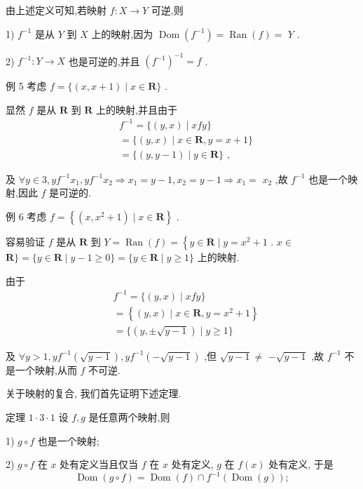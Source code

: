 由上述定义可知,若映射 $f : X \rightarrow  Y$ 可逆,则

1) ${f}^{-1}$ 是从 $Y$ 到 $X$ 上的映射,因为 $\operatorname{Dom}\left( {f}^{-1}\right)  = \operatorname{Ran}\left( f\right)  =$  $Y$ .

2) ${f}^{-1} : Y \rightarrow  X$ 也是可逆的,并且 ${\left( {f}^{-1}\right) }^{-1} = f$ .

例 5 考虑 $f = \{ \left( {x,x + 1}\right)  \mid  x \in  \mathbf{R}\}$ .

显然 $f$ 是从 $\mathbf{R}$ 到 $\mathbf{R}$ 上的映射,并且由于
\begin{align*}
	&{f}^{-1} = \{ \left( {y,x}\right)  \mid  {xfy}\}\\
	&= \{ \left( {y,x}\right)  \mid  x \in  \mathbf{R},y = x + 1\}\\
	&= \{ \left( {y,y - 1}\right)  \mid  y \in  \mathbf{R}\} \text{ , }
\end{align*}

及 $\forall y \in  3,y{f}^{-1}{x}_{1},y{f}^{-1}{x}_{2} \Rightarrow  {x}_{1} = y - 1,{x}_{2} = y - 1 \Rightarrow  {x}_{1} =$  ${x}_{2}$ ,故 ${f}^{-1}$ 也是一个映射,因此 $f$ 是可逆的.

例 6 考虑 $f = \left\{  {\left( {x,{x}^{2} + 1}\right)  \mid  x \in  \mathbf{R}}\right\}$ .

容易验证 $f$ 是从 $\mathbf{R}$ 到 $Y = \operatorname{Ran}\left( f\right)  = \left\{  {y \in  \mathbf{R} \mid  y = {x}^{2} + 1}\right.$ . $x \in$  $\mathbf{R}\}  = \{ y \in  \mathbf{R} \mid  y - 1 \geq  0\}  = \{ y \in  \mathbf{R} \mid  y \geq  1\}$ 上的映射.

由于
\begin{align*}
	&{f}^{-1} = \{ \left( {y,x}\right)  \mid  {xfy}\}\\
	&= \left\{  {\left( {y,x}\right)  \mid  x \in  \mathbf{R},y = {x}^{2} + 1}\right\}\\
	&= \{ \left( {y, \pm  \sqrt{y - 1}}\right)  \mid  y \geq  1\}
\end{align*}

及 $\forall y > 1,y{f}^{-1}\left( \sqrt{y - 1}\right) ,y{f}^{-1}\left( {-\sqrt{y - 1}}\right)$ ,但 $\sqrt{y - 1} \neq$  $- \sqrt{y - 1}$ ,故 ${f}^{-1}$ 不是一个映射,从而 $f$ 不可逆.

关于映射的复合, 我们首先证明下述定理.

定理 $1 \cdot  3 \cdot  1$ 设 $f,g$ 是任意两个映射,则

1) $g \circ  f$ 也是一个映射;

2) $g \circ  f$ 在 $x$ 处有定义当且仅当 $f$ 在 $x$ 处有定义, $g$ 在 $f\left( x\right)$ 处有定义, 于是
$$\operatorname{Dom}\left( {g \circ  f}\right)  = \operatorname{Dom}\left( f\right)  \cap  {f}^{-1}\left( {\operatorname{Dom}\left( g\right) }\right) ;$$


